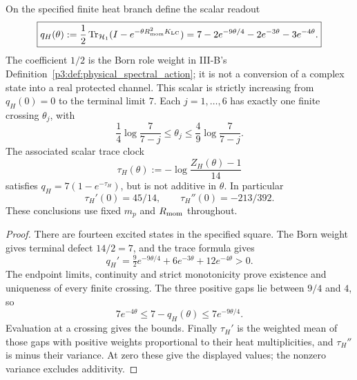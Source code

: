 \documentclass[12pt,a4paper]{article}
\begin{document}
\begin{theorem}
\label{p3c:thm:v2218-born-heat-depth}
On the specified finite heat branch define the scalar readout
\begin{equation}
 \boxed{q_H(\theta):=\frac12\operatorname{Tr}_{\mathcal H_1}
       (I-e^{-\theta R_{\mathrm{mom}}^2K_{\rm LC}})
 =7-2e^{-9\theta/4}-2e^{-3\theta}-3e^{-4\theta}.}
 \label{p3c:eq:v2218-born-heat-depth}
\end{equation}
The coefficient \(1/2\) is the Born role weight in III-B's
Definition~\ref{p3:def:physical_spectral_action}; it is not a conversion
of a complex state into a real protected channel. This scalar is
strictly increasing from \(q_H(0)=0\) to the terminal limit \(7\).
Each \(j=1,\ldots,6\) has exactly one finite crossing \(\theta_j\),
with
\begin{equation}
 \frac14\log\frac7{7-j}\le\theta_j
 \le\frac49\log\frac7{7-j}.
 \label{p3c:eq:v2218-born-depth-crossing-bounds}
\end{equation}
The associated scalar trace clock
\[
 \tau_H(\theta):=-\log\frac{Z_H(\theta)-1}{14}
\]
satisfies \(q_H=7(1-e^{-\tau_H})\), but is not additive in
\(\theta\). In particular
\[
 \tau_H'(0)=45/14,\qquad \tau_H''(0)=-213/392.
\]
These conclusions use fixed \(m_p\) and \(R_{\mathrm{mom}}\) throughout.
\end{theorem}
\begin{proof}
There are fourteen excited states in the specified square. The Born
weight gives terminal defect \(14/2=7\), and the trace formula gives
\[
 q_H'=\tfrac92e^{-9\theta/4}+6e^{-3\theta}
                         +12e^{-4\theta}>0.
\]
The endpoint limits, continuity and strict monotonicity prove existence
and uniqueness of every finite crossing. The three positive gaps lie
between \(9/4\) and \(4\), so
\[
 7e^{-4\theta}\le7-q_H(\theta)\le7e^{-9\theta/4}.
\]
Evaluation at a crossing gives the bounds. Finally
\(\tau_H'\) is the weighted mean of those gaps with positive weights
proportional to their heat multiplicities, and
\(\tau_H''\) is minus their variance. At zero these give the
displayed values; the nonzero variance excludes additivity.
\end{proof}
\end{document}
